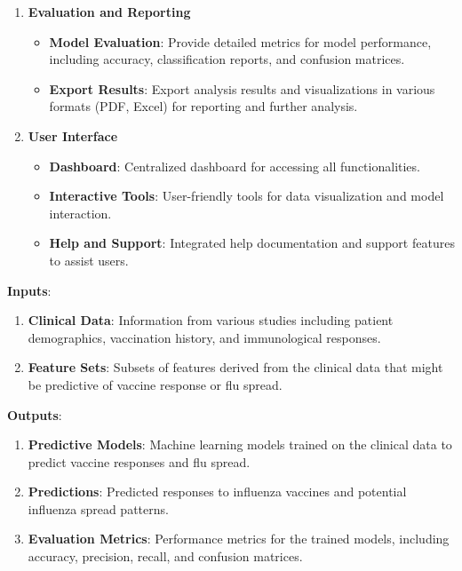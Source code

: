 \documentclass[runningheads,a4paper,11pt]{report}
\begin{document}
\begin{enumerate}
\begin{itemize}
    \end{itemize}
    \item \textbf{Evaluation and Reporting}
    \begin{itemize}
        \item \textbf{Model Evaluation}: Provide detailed metrics for model performance, including accuracy, classification reports, and confusion matrices.
        \item \textbf{Export Results}: Export analysis results and visualizations in various formats (PDF, Excel) for reporting and further analysis.
    \end{itemize}
    \item \textbf{User Interface}
    \begin{itemize}
        \item \textbf{Dashboard}: Centralized dashboard for accessing all functionalities.
        \item \textbf{Interactive Tools}: User-friendly tools for data visualization and model interaction.
        \item \textbf{Help and Support}: Integrated help documentation and support features to assist users.

    \end{itemize}

\end{enumerate}

 \textbf{Inputs}:

\begin{enumerate}
    \item \textbf{Clinical Data}: Information from various studies including patient demographics, vaccination history, and immunological responses.
    \item \textbf{Feature Sets}: Subsets of features derived from the clinical data that might be predictive of vaccine response or flu spread.
\end{enumerate}
\textbf{Outputs}:

\begin{enumerate}
    \item \textbf{Predictive Models}: Machine learning models trained on the clinical data to predict vaccine responses and flu spread.
    \item \textbf{Predictions}: Predicted responses to influenza vaccines and potential influenza spread patterns.
    \item \textbf{Evaluation Metrics}: Performance metrics for the trained models, including accuracy, precision, recall, and confusion matrices.
\end{enumerate}
\end{document}
